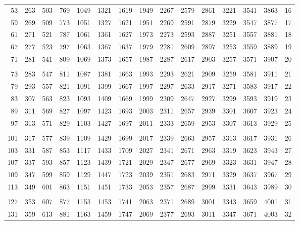 \begin{tabular}{rrrrrrrrrrrrrr@{\;\;\vrule width \heavyrulewidth\;}r}
  53 &  263 &  503 &  769 & 1049 & 1321 & 1619 & 1949 & 2267 & 2579 & 2861 & 3221 & 3541 & 3863 &   16\\
  59 &  269 &  509 &  773 & 1051 & 1327 & 1621 & 1951 & 2269 & 2591 & 2879 & 3229 & 3547 & 3877 &   17\\
  61 &  271 &  521 &  787 & 1061 & 1361 & 1627 & 1973 & 2273 & 2593 & 2887 & 3251 & 3557 & 3881 &   18\\
  67 &  277 &  523 &  797 & 1063 & 1367 & 1637 & 1979 & 2281 & 2609 & 2897 & 3253 & 3559 & 3889 &   19\\
  71 &  281 &  541 &  809 & 1069 & 1373 & 1657 & 1987 & 2287 & 2617 & 2903 & 3257 & 3571 & 3907 &   20\\
&&&&&&&&&&&&&&\\
  73 &  283 &  547 &  811 & 1087 & 1381 & 1663 & 1993 & 2293 & 2621 & 2909 & 3259 & 3581 & 3911 &   21\\
  79 &  293 &  557 &  821 & 1091 & 1399 & 1667 & 1997 & 2297 & 2633 & 2917 & 3271 & 3583 & 3917 &   22\\
  83 &  307 &  563 &  823 & 1093 & 1409 & 1669 & 1999 & 2309 & 2647 & 2927 & 3299 & 3593 & 3919 &   23\\
  89 &  311 &  569 &  827 & 1097 & 1423 & 1693 & 2003 & 2311 & 2657 & 2939 & 3301 & 3607 & 3923 &   24\\
  97 &  313 &  571 &  829 & 1103 & 1427 & 1697 & 2011 & 2333 & 2659 & 2953 & 3307 & 3613 & 3929 &   25\\
&&&&&&&&&&&&&&\\
 101 &  317 &  577 &  839 & 1109 & 1429 & 1699 & 2017 & 2339 & 2663 & 2957 & 3313 & 3617 & 3931 &   26\\
 103 &  331 &  587 &  853 & 1117 & 1433 & 1709 & 2027 & 2341 & 2671 & 2963 & 3319 & 3623 & 3943 &   27\\
 107 &  337 &  593 &  857 & 1123 & 1439 & 1721 & 2029 & 2347 & 2677 & 2969 & 3323 & 3631 & 3947 &   28\\
 109 &  347 &  599 &  859 & 1129 & 1447 & 1723 & 2039 & 2351 & 2683 & 2971 & 3329 & 3637 & 3967 &   29\\
 113 &  349 &  601 &  863 & 1151 & 1451 & 1733 & 2053 & 2357 & 2687 & 2999 & 3331 & 3643 & 3989 &   30\\
&&&&&&&&&&&&&&\\
 127 &  353 &  607 &  877 & 1153 & 1453 & 1741 & 2063 & 2371 & 2689 & 3001 & 3343 & 3659 & 4001 &   31\\
 131 &  359 &  613 &  881 & 1163 & 1459 & 1747 & 2069 & 2377 & 2693 & 3011 & 3347 & 3671 & 4003 &   32\\

\end{tabular}
